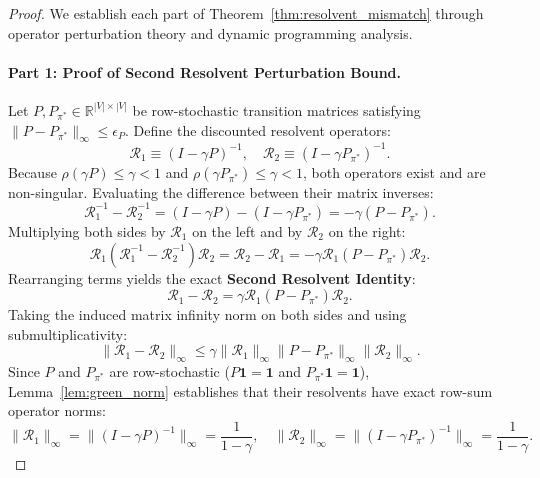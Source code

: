 \documentclass[11pt,a4paper]{article}
\begin{document}
\begin{proof}
We establish each part of Theorem~\ref{thm:resolvent_mismatch} through operator perturbation theory and dynamic programming analysis.

\paragraph{Part 1: Proof of Second Resolvent Perturbation Bound.}
Let $P, P_{\pi^*} \in \mathbb{R}^{|V| \times |V|}$ be row-stochastic transition matrices satisfying $\|P - P_{\pi^*}\|_\infty \le \epsilon_P$.
Define the discounted resolvent operators:
\begin{equation}
\mathcal{R}_1 \equiv (I - \gamma P)^{-1}, \quad \mathcal{R}_2 \equiv (I - \gamma P_{\pi^*})^{-1}.
\end{equation}
Because $\rho(\gamma P) \le \gamma < 1$ and $\rho(\gamma P_{\pi^*}) \le \gamma < 1$, both operators exist and are non-singular. Evaluating the difference between their matrix inverses:
\begin{equation}
\mathcal{R}_1^{-1} - \mathcal{R}_2^{-1} = (I - \gamma P) - (I - \gamma P_{\pi^*}) = -\gamma (P - P_{\pi^*}).
\end{equation}
Multiplying both sides by $\mathcal{R}_1$ on the left and by $\mathcal{R}_2$ on the right:
\begin{equation}
\mathcal{R}_1 \left( \mathcal{R}_1^{-1} - \mathcal{R}_2^{-1} \right) \mathcal{R}_2 = \mathcal{R}_2 - \mathcal{R}_1 = -\gamma \mathcal{R}_1 (P - P_{\pi^*}) \mathcal{R}_2.
\end{equation}
Rearranging terms yields the exact \textbf{Second Resolvent Identity}:
\begin{equation}
\label{eq:second_resolvent_identity_app}
\mathcal{R}_1 - \mathcal{R}_2 = \gamma \mathcal{R}_1 (P - P_{\pi^*}) \mathcal{R}_2.
\end{equation}
Taking the induced matrix infinity norm on both sides and using submultiplicativity:
\begin{equation}
\label{eq:resolvent_diff_norm}
\|\mathcal{R}_1 - \mathcal{R}_2\|_\infty \le \gamma \|\mathcal{R}_1\|_\infty \|P - P_{\pi^*}\|_\infty \|\mathcal{R}_2\|_\infty.
\end{equation}
Since $P$ and $P_{\pi^*}$ are row-stochastic ($P \mathbf{1} = \mathbf{1}$ and $P_{\pi^*} \mathbf{1} = \mathbf{1}$), Lemma~\ref{lem:green_norm} establishes that their resolvents have exact row-sum operator norms:
\begin{equation}
\|\mathcal{R}_1\|_\infty = \|(I - \gamma P)^{-1}\|_\infty = \frac{1}{1 - \gamma}, \quad \|\mathcal{R}_2\|_\infty = \|(I - \gamma P_{\pi^*})^{-1}\|_\infty = \frac{1}{1 - \gamma}.

\end{equation}
\end{proof}
\end{document}
